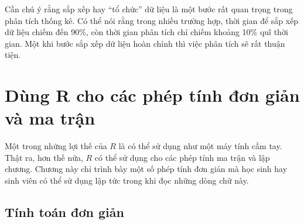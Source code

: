 \documentclass[
]{book}
\begin{document}
Cần chú ý rằng sắp xếp hay ``tổ chức'' dữ liệu là một bước rất quan trọng trong phân tích thống kê. Có thể nói rằng trong nhiều trường hợp, thời gian để sắp xếp dữ liệu chiếm đến 90\%, còn thời gian phân tích chỉ chiếm khoảng 10\% quĩ thời gian. Một khi bước sắp xếp dữ liệu hoàn chỉnh thì việc phân tích sẽ rất thuận tiện.

\hypertarget{Dung-R-cho-cac-phep-tinh-don-gian-va-ma-tran}{%
\chapter{Dùng R cho các phép tính đơn giản và ma trận}\label{Dung-R-cho-cac-phep-tinh-don-gian-va-ma-tran}}

Một trong những lợi thế của \(R\) là có thể sử dụng như một máy tính cầm tay. Thật ra, hơn thế nữa, \(R\) có thể sử dụng cho các phép tính ma trận và lập chương. Chương này chỉ trình bày một số phép tính đơn giản mà học sinh hay sinh viên có thể sử dụng lập tức trong khi đọc những dòng chữ này.

\hypertarget{tuxednh-touxe1n-ux111ux1a1n-giux1ea3n}{%
\section{Tính toán đơn giản}\label{tuxednh-touxe1n-ux111ux1a1n-giux1ea3n}}
\end{document}
